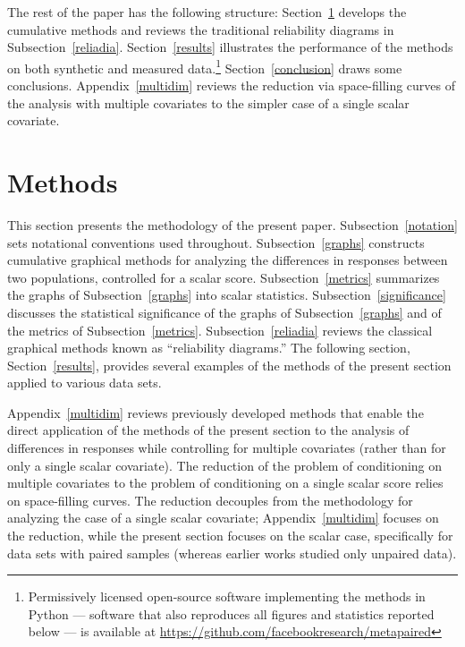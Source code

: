 \documentclass[]{fairmeta}
\begin{document}
The rest of the paper has the following structure:
Section~\ref{methods} develops the cumulative methods
and reviews the traditional reliability diagrams in Subsection~\ref{reliadia}.
Section~\ref{results} illustrates the performance of the methods
on both synthetic and measured data.\footnote{Permissively licensed
open-source software implementing the methods in Python --- software that
also reproduces all figures and statistics reported below --- is available
at \url{https://github.com/facebookresearch/metapaired}}
Section~\ref{conclusion} draws some conclusions.
Appendix~\ref{multidim} reviews the reduction via space-filling curves
of the analysis with multiple covariates to the simpler case
of a single scalar covariate.



\section{Methods}
\label{methods}

This section presents the methodology of the present paper.
Subsection~\ref{notation} sets notational conventions used throughout.
Subsection~\ref{graphs} constructs cumulative graphical methods for analyzing
the differences in responses between two populations,
controlled for a scalar score.
Subsection~\ref{metrics} summarizes the graphs of Subsection~\ref{graphs}
into scalar statistics.
Subsection~\ref{significance} discusses the statistical significance
of the graphs of Subsection~\ref{graphs} and of the metrics
of Subsection~\ref{metrics}.
Subsection~\ref{reliadia} reviews the classical graphical methods
known as ``reliability diagrams.''
The following section, Section~\ref{results}, provides several examples
of the methods of the present section applied to various data sets.

Appendix~\ref{multidim} reviews previously developed methods that enable
the direct application of the methods of the present section
to the analysis of differences in responses
while controlling for multiple covariates
(rather than for only a single scalar covariate).
The reduction of the problem of conditioning on multiple covariates
to the problem of conditioning on a single scalar score
relies on space-filling curves.
The reduction decouples from the methodology for analyzing the case
of a single scalar covariate; Appendix~\ref{multidim} focuses on the reduction,
while the present section focuses on the scalar case,
specifically for data sets with paired samples
(whereas earlier works studied only unpaired data).
\end{document}
